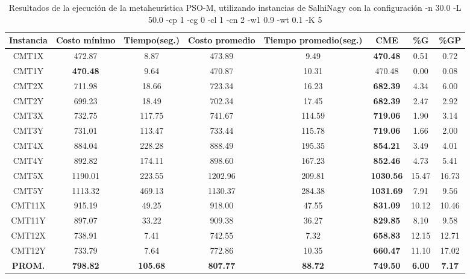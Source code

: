 \begin{table}[h]
\caption{Resultados de la ejecución de la metaheurística PSO-M, utilizando instancias de SalhiNagy con la configuración -n 30.0 -L 50.0 -cp 1 -cg 0 -cl 1 -cn 2 -w1 0.9 -wt 0.1 -K 5}
\centering
\small
\begin{tabular}{c c c c c c c c}
\hline\hline
Instancia & Costo mínimo & Tiempo(seg.) & Costo promedio & Tiempo promedio(seg.) & CME & \%G & \%GP \\ [0.5ex]
\hline
CMT1X & 472.87 & 8.87 & 
473.89 & 9.49 & \bf{470.48} & 
0.51 & 0.72\\CMT1Y & \bf{470.48} & 9.64 & 
470.87 & 10.31 & 470.48 & 0.00
 & 0.08\\CMT2X & 711.98 & 18.66 & 
723.34 & 16.23 & \bf{682.39} & 
4.34 & 6.00\\CMT2Y & 699.23 & 18.49 & 
702.34 & 17.45 & \bf{682.39} & 
2.47 & 2.92\\CMT3X & 732.75 & 117.75 & 
741.67 & 114.59 & \bf{719.06} & 
1.90 & 3.14\\CMT3Y & 731.01 & 113.47 & 
733.44 & 115.78 & \bf{719.06} & 
1.66 & 2.00\\CMT4X & 884.04 & 228.28 & 
888.49 & 195.35 & \bf{854.21} & 
3.49 & 4.01\\CMT4Y & 892.82 & 174.11 & 
898.60 & 167.23 & \bf{852.46} & 
4.73 & 5.41\\CMT5X & 1190.01 & 223.55 & 
1202.96 & 209.81 & \bf{1030.56} & 
15.47 & 16.73\\CMT5Y & 1113.32 & 469.13 & 
1130.37 & 284.38 & \bf{1031.69} & 
7.91 & 9.56\\CMT11X & 915.19 & 49.25 & 
918.00 & 47.55 & \bf{831.09} & 
10.12 & 10.46\\CMT11Y & 897.07 & 33.22 & 
909.38 & 36.27 & \bf{829.85} & 
8.10 & 9.58\\CMT12X & 738.91 & 7.41 & 
742.55 & 7.32 & \bf{658.83} & 
12.15 & 12.71\\CMT12Y & 733.79 & 7.64 & 
772.86 & 10.35 & \bf{660.47} & 
11.10 & 17.02\\\bf{PROM.} & 
\bf{798.82} & \bf{105.68} & \bf{807.77} & \bf{88.72} & \bf{749.50} & \bf{6.00} & \bf{7.17}\\[1ex]\hline
\end{tabular}
\label{table:nonlin}
\end{table}
